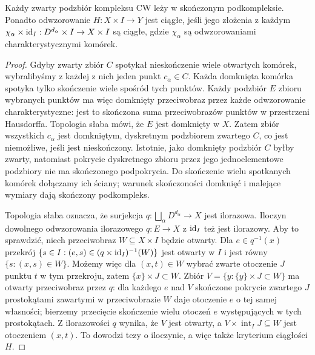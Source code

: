 \begin{lemat}
\label{lem:zwartosc-cw-pi}
Każdy zwarty podzbiór kompleksu CW leży w skończonym podkompleksie.
Ponadto odwzorowanie $H:X\times I\to Y$ jest ciągłe, jeśli jego złożenia
z każdym $\chi_\alpha\times\mathrm{id}_I:D^{d_\alpha}\times I\to X\times I$
są ciągłe, gdzie $\chi_\alpha$ są odwzorowaniami charakterystycznymi komórek.
\end{lemat}
\begin{proof}
Gdyby zwarty zbiór $C$ spotykał nieskończenie wiele otwartych komórek,
wybralibyśmy z każdej z nich jeden punkt $c_\alpha\in C$.
Każda domknięta komórka spotyka tylko skończenie wiele spośród tych punktów.
Każdy podzbiór $E$ zbioru wybranych punktów ma więc domknięty
przeciwobraz przez każde odwzorowanie charakterystyczne: jest to skończona
suma przeciwobrazów punktów w przestrzeni Hausdorffa.
Topologia słaba mówi, że $E$ jest domknięty w $X$.
Zatem zbiór wszystkich $c_\alpha$ jest domkniętym, dyskretnym
podzbiorem zwartego $C$, co jest niemożliwe, jeśli jest nieskończony.
Istotnie, jako domknięty podzbiór $C$ byłby zwarty, natomiast
pokrycie dyskretnego zbioru przez jego jednoelementowe podzbiory
nie ma skończonego podpokrycia.
Do skończenie wielu spotkanych komórek dołączamy ich ściany;
warunek skończoności domknięć i malejące wymiary dają skończony podkompleks.

Topologia słaba oznacza, że surjekcja
$q:\bigsqcup_\alpha D^{d_\alpha}\to X$ jest ilorazowa.
Iloczyn dowolnego odwzorowania ilorazowego $q:E\to X$ z $\mathrm{id}_I$ też jest ilorazowy.
Aby to sprawdzić, niech przeciwobraz $W\subseteq X\times I$ będzie otwarty.
Dla $e\in q^{-1}(x)$ przekrój
$\{s\in I:(e,s)\in(q\times\mathrm{id}_I)^{-1}(W)\}$ jest otwarty w $I$
i jest równy $\{s:(x,s)\in W\}$.
Możemy więc dla $(x,t)\in W$ wybrać zwarte otoczenie $J$ punktu $t$
w tym przekroju, zatem $\{x\}\times J\subset W$. Zbiór
$V=\{y:\{y\}\times J\subset W\}$ ma otwarty przeciwobraz przez $q$:
dla każdego $e$ nad $V$ skończone pokrycie zwartego $J$
prostokątami zawartymi w przeciwobrazie $W$ daje otoczenie $e$
o tej samej własności; bierzemy przecięcie skończenie wielu
otoczeń $e$ występujących w tych prostokątach.
Z ilorazowości $q$ wynika, że $V$ jest otwarty, a
$V\times\operatorname{int}_I J\subseteq W$ jest otoczeniem $(x,t)$.
To dowodzi tezy o iloczynie, a więc także kryterium ciągłości $H$.
\end{proof}

